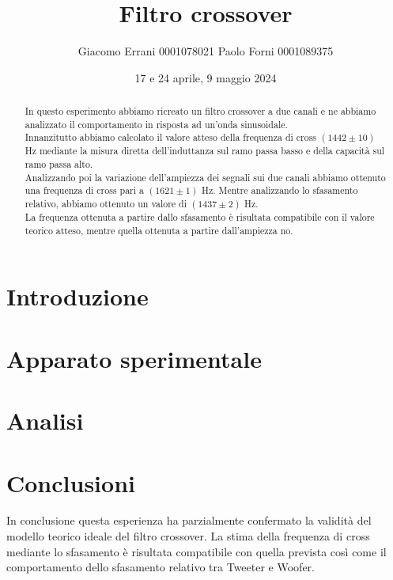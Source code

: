 \documentclass[12pt,a4paper]{article}
\title{Filtro crossover} %
\date{17 e 24 aprile, 9 maggio 2024}
\author{Giacomo Errani 0001078021 Paolo Forni 0001089375}
\newcommand{\theoryF}{ $(1442 \pm 10)$ Hz}
\newcommand{\amplitudeF}{$(1621 \pm 1)$ Hz}
\newcommand{\phaseF}{$(1437 \pm 2)$ Hz}
\begin{document}
\maketitle

\begin{abstract}

  In questo esperimento abbiamo ricreato un filtro crossover a due canali e ne abbiamo analizzato il comportamento
  in risposta ad un'onda sinusoidale. \\
  Innanzitutto abbiamo calcolato il valore atteso della frequenza di cross \theoryF \hspace{1pt} mediante la misura
  diretta dell'induttanza sul ramo passa basso e della capacità sul ramo passa alto. \\
  Analizzando poi la variazione dell'ampiezza dei segnali sui due canali abbiamo ottenuto una frequenza di cross pari a
  \amplitudeF. Mentre analizzando lo sfasamento relativo, abbiamo ottenuto un valore di \phaseF. \\
  La frequenza ottenuta a partire dallo sfasamento è risultata compatibile con il valore teorico atteso, mentre quella
  ottenuta a partire dall'ampiezza no.

\end{abstract}


\section{Introduzione}\label{sec:introduzione}

  


\section{Apparato sperimentale}\label{sec:apparato-sperimentale}

  


\section{Analisi}\label{sec:analisi}

  

\section{Conclusioni}
In conclusione questa esperienza ha parzialmente confermato la validità del modello teorico ideale del filtro crossover. La stima della frequenza di cross mediante lo sfasamento è risultata compatibile con quella prevista così come il comportamento dello sfasamento relativo tra Tweeter e Woofer. 
\end{document}
